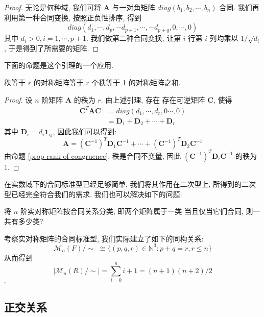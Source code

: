 \documentclass[UTF8]{book}
\newenvironment{solution}{{\noindent\it Solution.} }{\hfill $\square$\par}
\begin{document}
\begin{proof}
    无论是何种域, 我们可将 $\boldsymbol{A}$ 
    与一对角矩阵 $diag(b_1,b_2,\cdots,b_n)$ 合同. 
    我们再利用第一种合同变换, 按照正负性排序, 得到
    $$ diag(d_1,\cdots,d_p,-d_{p+1},\cdots,-d_{p+q},0,\cdots,0) $$ 
    其中 $d_i >0, i=1,\cdots,p+1$. 
    我们做第二种合同变换, 让第 $i$ 行第 $i$ 列均乘以 $1/\sqrt{d_i}$, 
    于是得到了所需要的矩阵. 
\end{proof}

下面的命题是这个引理的一个应用. 

\begin{proposition}
    秩等于 $r$ 的对称矩阵等于 $r$ 个秩等于 1 的对称矩阵之和. 
\end{proposition}

\begin{proof}
    设 $n$ 阶矩阵 $\boldsymbol{A}$ 的秩为 $r$. 
    由上述引理, 存在 存在可逆矩阵 $\boldsymbol{C}$, 使得 
    $$\begin{aligned}
    \boldsymbol{C}^T\boldsymbol{A}\boldsymbol{C} &= 
    diag(d_1,\cdots,d_r,0\cdots,0) \\
    &= \boldsymbol{D}_1 + \boldsymbol{D}_2 + \cdots + \boldsymbol{D}_r
    \end{aligned}$$
    其中 $\boldsymbol{D}_i = d_i\boldsymbol{1}_{ij}$, 
    因此我们可以得到: 
    $$ \boldsymbol{A} = 
    (\boldsymbol{C}^{-1})^T\boldsymbol{D}_1\boldsymbol{C}^{-1} + \cdots + 
    (\boldsymbol{C}^{-1})^T\boldsymbol{D}_2\boldsymbol{C}^{-1}
    $$
    由命题 \ref{prop rank of congruence}, 秩是合同不变量, 
    因此 $ (\boldsymbol{C}^{-1})^T\boldsymbol{D}_i\boldsymbol{C}^{-1} $ 
    的秩为1. 
\end{proof}

在实数域下的合同标准型已经足够简单, 
我们将其作用在二次型上, 所得到的二次型已经完全符合我们的需求. 
我们也可以解决如下的问题: 

\begin{proposition}
    将 $n$ 阶实对称矩阵按合同关系分类, 即两个矩阵属于一类
    当且仅当它们合同, 则一共有多少类? 
\end{proposition}

\begin{solution}
    考察实对称矩阵的合同标准型, 
    我们实际建立了如下的同构关系: 
    $$ \mathcal{M}_{n}(F)/\sim \,\, \cong 
    \{(p,q,r)\in \mathbb{N}^3:p+q=r,r\leq n\} $$
    从而得到 
    $$ |\mathcal{M}_{n}(R)/\sim| = \sum_{i=0}^{n} i+1 = (n+1)(n+2)/2 $$
\end{solution}


\subsection{正交关系}
\end{document}
